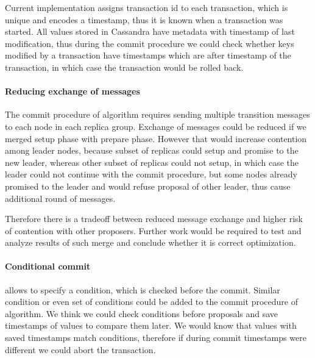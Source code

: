 Current implementation assigns transaction id to each transaction, which is unique and encodes a timestamp, thus it is known when a transaction was started. All values stored in Cassandra have metadata with timestamp of last modification, thus during the commit procedure we could check whether keys modified by a transaction have timestamps which are after timestamp of the transaction, in which case the transaction would be rolled back.

\paragraph{Reducing exchange of messages}
The commit procedure of \mpt algorithm requires sending multiple transition messages to each node in each replica group. Exchange of messages could be reduced if we merged setup phase with prepare phase. However that would increase contention among leader nodes, because subset of replicas could setup and promise to the new leader, whereas other subset of replicas could not setup, in which case the leader could not continue with the commit procedure, but some nodes already promised to the leader and would refuse proposal of other leader, thus cause additional round of messages. 

Therefore there is a tradeoff between reduced message exchange and higher risk of contention with other proposers. Further work would be required to test and analyze results of such merge and conclude whether it is correct optimization.


\paragraph{Conditional commit}
\lwt allows to specify a condition, which is checked before the commit. Similar condition or even set of conditions could be added to the commit procedure of \mpt algorithm. We think we could check conditions before proposals and save timestamps of values to compare them later. We would know that values with saved timestamps match conditions, therefore if during commit timestamps were different we could abort the transaction.

